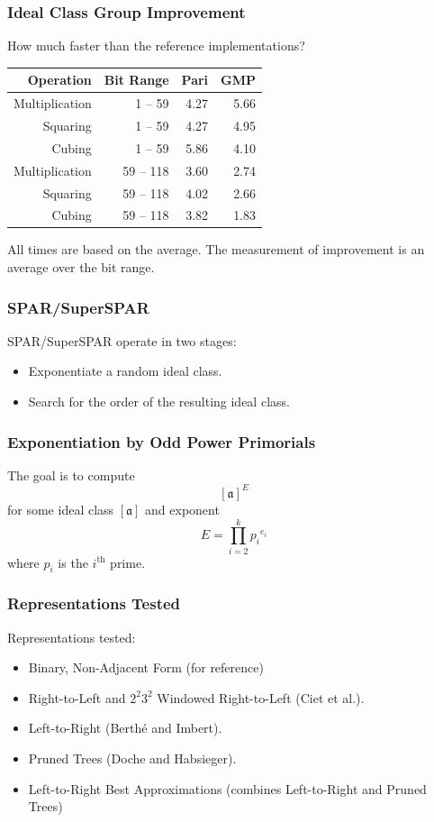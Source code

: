 \documentclass{beamer}
\newcommand{\ideal}{\mathfrak}
\newcommand{\idealclass}[1]{\left[ \ideal #1 \right]}
\newcommand{\aclass}{\idealclass a}
\newcommand{\ith}{i^{\textrm{th}}}
\newcommand{\smallfont}{\fontsize{6pt}{7.2}\selectfont}
\begin{document}
\begin{frame}
\frametitle{Ideal Class Group Improvement}
How much faster than the reference implementations?
\begin{table}
\centering
\begin{tabular}{ | r | r | r | r | }
\hline
Operation & Bit Range & Pari & GMP \\
\hline
Multiplication & 1 -- 59 & 4.27 & 5.66 \\
Squaring & 1 -- 59 & 4.27 & 4.95 \\
Cubing & 1 -- 59 & 5.86 & 4.10 \\
Multiplication & 59 -- 118 & 3.60 & 2.74 \\
Squaring & 59 -- 118 & 4.02 & 2.66 \\
Cubing & 59 -- 118 & 3.82 & 1.83 \\
\hline
\end{tabular}
\end{table}

\bigskip
\smallfont
All times are based on the average.  The measurement of improvement is an average over the bit range.
\end{frame}



\begin{frame}
\frametitle{SPAR/SuperSPAR}
SPAR/SuperSPAR operate in two stages:
\begin{itemize}
\item Exponentiate a random ideal class.
\item Search for the order of the resulting ideal class.
\end{itemize}
\end{frame}

\begin{frame}
\frametitle{Exponentiation by Odd Power Primorials}
The goal is to compute
\[
\aclass ^ E
\]
for some ideal class $\aclass$ and exponent
\[
	E = \prod_{i=2}^k {p_i}^{e_i}
\]
where $p_i$ is the $\ith$ prime.
\end{frame}

\begin{frame}
\frametitle{Representations Tested}
Representations tested:
\begin{itemize}
\item Binary, Non-Adjacent Form (for reference)
\item Right-to-Left and $2^2 3^2$ Windowed Right-to-Left (Ciet et al.).
\item Left-to-Right (Berth{\'e} and Imbert).
\item Pruned Trees (Doche and Habsieger).
\item Left-to-Right Best Approximations (combines Left-to-Right and Pruned Trees)
\end{itemize}
\end{frame}
\end{document}

